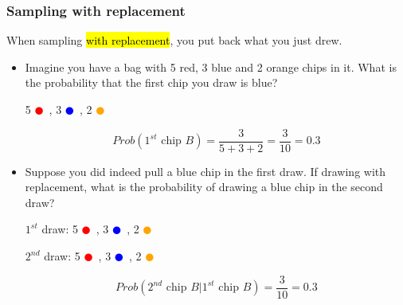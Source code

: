 \documentclass[slidestop,compress,mathserif]{beamer}
\begin{document}
\begin{frame}
\frametitle{Sampling with replacement}

When sampling \hl{with replacement}, you put back what you just drew.

\pause

\begin{itemize}

\item Imagine you have a bag with 5 red, 3 blue and 2 orange chips in it. What is the probability that the first chip you draw is blue?
\begin{center}
5 \textcolor{red}{$\CIRCLE$}~, 3 \textcolor{blue}{$\CIRCLE$}~, 2 \textcolor{orange}{$\CIRCLE$}
\end{center}

\pause

\[ Prob(1^{st} \text{ chip } B) = \frac{3}{5 + 3 + 2} = \frac{3}{10} = 0.3 \]

\pause

\item Suppose you did indeed pull a blue chip in the first draw. If drawing with replacement, what is the probability of drawing a blue chip in the second draw?

\pause

\begin{center}
$1^{st}$ draw: 5 \textcolor{red}{$\CIRCLE$}~, 3 \textcolor{blue}{$\CIRCLE$}~, 2 \textcolor{orange}{$\CIRCLE$} \\

\pause

$2^{nd}$ draw: 5 \textcolor{red}{$\CIRCLE$}~, 3 \textcolor{blue}{$\CIRCLE$}~, 2 \textcolor{orange}{$\CIRCLE$}
\end{center}

\pause

\[ Prob(2^{nd} \text{ chip } B | 1^{st} \text{ chip } B) = \frac{3}{10} = 0.3 \]

\end{itemize}

\end{frame}

\end{document}
